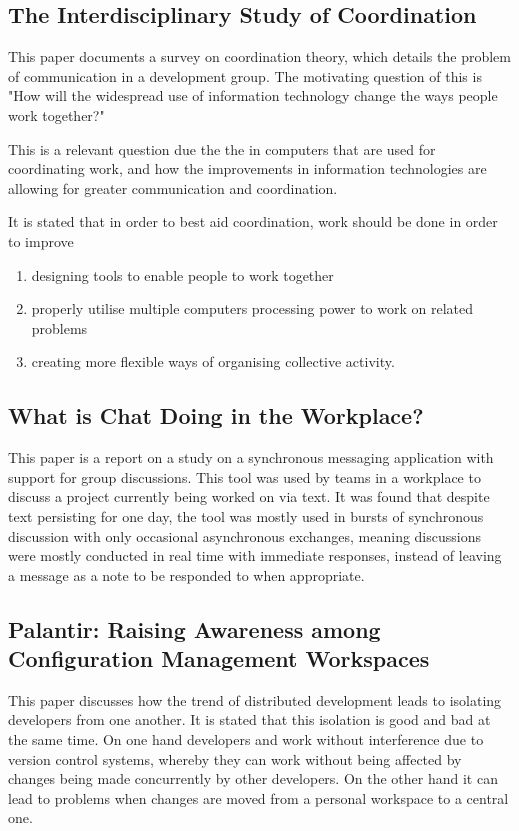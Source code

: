 \documentclass{l4proj}
\begin{document}
\subsection {The Interdisciplinary Study of Coordination}

This paper documents a survey on coordination theory, which details the problem of communication in a development group.  The motivating question of this is "How will the widespread use of information technology change the ways people work together?"

This is a relevant question due the the in computers that are used for coordinating work, and how the improvements in information technologies are allowing for greater communication and coordination.

It is stated that in order to best aid coordination, work should be done in order to improve
\begin{enumerate}
\item designing tools to enable people to work together
\item properly utilise multiple computers processing power to work on related problems
\item creating more flexible ways of organising collective activity.
\end{enumerate}

\subsection {What is Chat Doing in the Workplace?}

This paper is a report on a study on a synchronous messaging application with support for group discussions.  This tool was used by teams in a workplace to discuss a project currently being worked on via text. It was found that despite text persisting for one day, the tool was mostly used in bursts of synchronous discussion with only occasional asynchronous exchanges, meaning discussions were mostly conducted in real time with immediate responses, instead of leaving a message as a note to be responded to when appropriate. 

\subsection {Palantir: Raising Awareness among Configuration Management Workspaces}

This paper discusses how the trend of distributed development leads to isolating developers from one another.  It is stated that this isolation is good and bad at the same time.  On one hand developers and work without interference due to version control systems, whereby they can work without being affected by changes being made concurrently by other developers.  On the other hand it can lead to problems when changes are moved from a personal workspace to a central one.  
\end{document}
